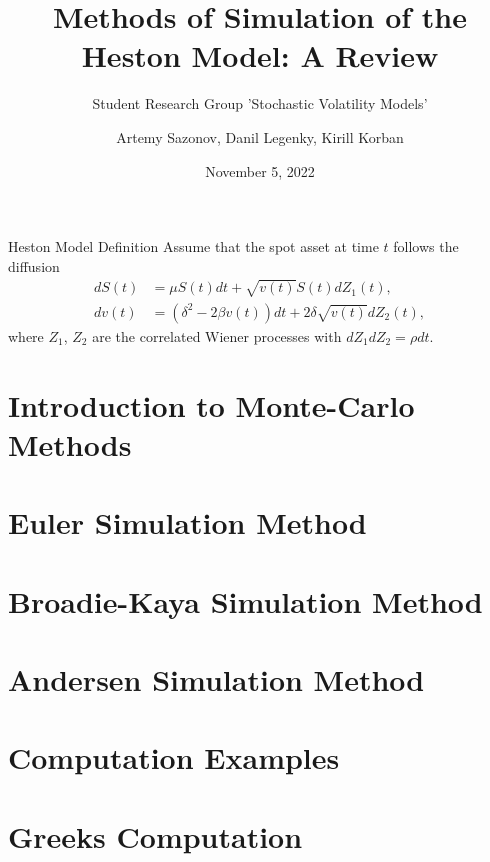 \documentclass{vegapresentation}
\subtitle{Student Research Group 'Stochastic Volatility Models'}
\title{Methods of Simulation of the Heston Model: A Review}
\author{Artemy Sazonov, Danil Legenky, Kirill Korban}
\institute{Lomonosov Moscow State Univesity, Faculty of Mechanics and Mathematics}
\date{November 5, 2022}
\begin{document}
    \maketitle

    \begin{frame}{Heston Model Definition}
        Assume that the spot asset at time $t$ follows the diffusion
        \begin{align}
            dS(t) & = \mu S(t)dt + \sqrt{v(t)} S(t) dZ_1(t), \label{Heston:price}\\
            dv(t) & = \left(\delta^2 - 2\beta v(t)\right) dt + 2\delta \sqrt{v(t)} dZ_2(t), \label{Heston:variance}
        \end{align}
        where $Z_1$, $Z_2$ are the correlated Wiener processes with $dZ_1dZ_2 = \rho dt$.
    \end{frame}

    \section{Introduction to Monte-Carlo Methods}
        

    \section{Euler Simulation Method}
        

    \section{Broadie-Kaya Simulation Method} 
        

    \section{Andersen Simulation Method}
        

    \section{Computation Examples}
        

    \section{Greeks Computation}
        
    
\end{document}
